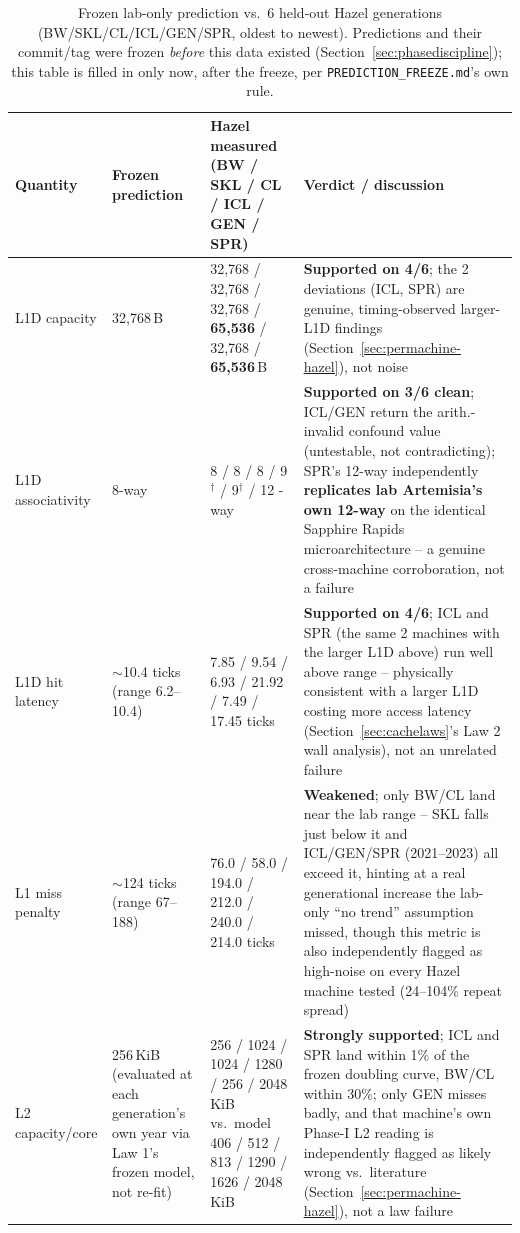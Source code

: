 \documentclass{article}
\begin{document}
\begin{table}[H]
\centering
{\tiny\setlength{\tabcolsep}{3pt}
\caption{Frozen lab-only prediction vs.\ 6 held-out Hazel generations (BW/SKL/CL/ICL/GEN/SPR, oldest to newest). Predictions and their commit/tag were frozen \emph{before} this data existed (Section~\ref{sec:phasediscipline}); this table is filled in only now, after the freeze, per \texttt{PREDICTION\_FREEZE.md}'s own rule.}
\label{tab:hazel-heldout}
\begin{tabularx}{\textwidth}{|X|X|X|X|}
\hline
Quantity & Frozen prediction & Hazel measured (BW / SKL / CL / ICL / GEN / SPR) & Verdict / discussion\\
\hline
L1D capacity & 32,768\,B & 32,768 / 32,768 / 32,768 / \textbf{65,536} / 32,768 / \textbf{65,536}\,B & \textbf{Supported on 4/6}; the 2 deviations (ICL, SPR) are genuine, timing-observed larger-L1D findings (Section~\ref{sec:permachine-hazel}), not noise\\
L1D associativity & 8-way & 8 / 8 / 8 / 9$^\dagger$ / 9$^\dagger$ / 12 -way & \textbf{Supported on 3/6 clean}; ICL/GEN return the arith.-invalid confound value (untestable, not contradicting); SPR's 12-way independently \textbf{replicates lab Artemisia's own 12-way} on the identical Sapphire Rapids microarchitecture -- a genuine cross-machine corroboration, not a failure\\
L1D hit latency & $\sim$10.4 ticks (range 6.2--10.4) & 7.85 / 9.54 / 6.93 / 21.92 / 7.49 / 17.45 ticks & \textbf{Supported on 4/6}; ICL and SPR (the same 2 machines with the larger L1D above) run well above range -- physically consistent with a larger L1D costing more access latency (Section~\ref{sec:cachelaws}'s Law 2 wall analysis), not an unrelated failure\\
L1 miss penalty & $\sim$124 ticks (range 67--188) & 76.0 / 58.0 / 194.0 / 212.0 / 240.0 / 214.0 ticks & \textbf{Weakened}; only BW/CL land near the lab range -- SKL falls just below it and ICL/GEN/SPR (2021--2023) all exceed it, hinting at a real generational increase the lab-only ``no trend'' assumption missed, though this metric is also independently flagged as high-noise on every Hazel machine tested (24--104\% repeat spread)\\
L2 capacity/core & 256\,KiB (evaluated at each generation's own year via Law 1's frozen model, not re-fit) & 256 / 1024 / 1024 / 1280 / 256 / 2048\,KiB vs.\ model 406 / 512 / 813 / 1290 / 1626 / 2048\,KiB & \textbf{Strongly supported}; ICL and SPR land within 1\% of the frozen doubling curve, BW/CL within 30\%; only GEN misses badly, and that machine's own Phase-I L2 reading is independently flagged as likely wrong vs.\ literature (Section~\ref{sec:permachine-hazel}), not a law failure\\

\end{tabularx}}
\end{table}
\end{document}
